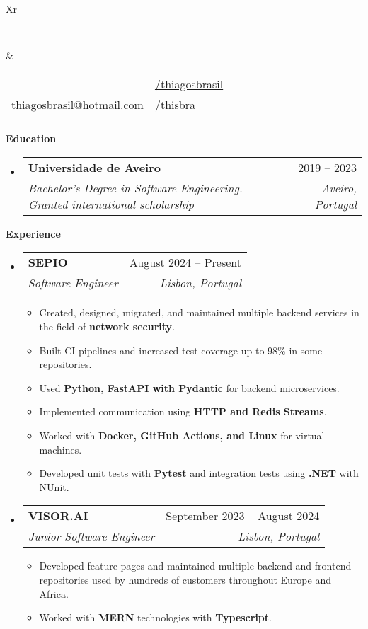 \documentclass[letterpaper,12pt]{article}[leftmargin=*]
\makeatletter
\def \fullname {Thiago S. Brasil}
\def \subtitle {}
\def \linkedinicon {\faLinkedin}
\def \linkedinlink {https://linkedin.com/in/thiagosbrasil/}
\def \linkedintext {/thiagosbrasil}
\def \phoneicon {\faPhone}
\def \phonetext {+351 933311220}
\def \emailicon {\faEnvelope}
\def \emaillink {mailto:thiagosbrasil@hotmail.com}
\def \emailtext {thiagosbrasil@hotmail.com}
\def \githubicon {\faGithub}
\def \githublink {https://github.com/thisbra}
\def \githubtext {/thisbra}
\def \headertype {\doublecol} %
\def \entryspacing {-4pt}
\def \linkedin {\linkedinicon \hspace{3pt}\href{\linkedinlink}{\linkedintext}}
\def \phone {\phoneicon \hspace{3pt}{ \phonetext}}
\def \email {\emailicon \hspace{3pt}\href{\emaillink}{\emailtext}}
\def \github {\githubicon \hspace{3pt}\href{\githublink}{\githubtext}}
\def \website {\websiteicon \hspace{3pt}\href{\websitelink}{\websitetext}}
\renewcommand{\section}[2]{\vspace{5pt}
  \colorbox{secondary}{\color{white}\raggedbottom\normalsize\textbf{{#1}{\hspace{7pt}#2}}}
}
\newcommand{\resumeEntryStart}{\begin{itemize}[leftmargin=2.5mm]}
\newcommand{\resumeEntryEnd}{\end{itemize}\vspace{\entryspacing}}
\newcommand{\resumeItemListStart}{\begin{itemize}[leftmargin=4.5mm]}
\newcommand{\resumeItemListEnd}{\end{itemize}}
\newcommand{\resumeItem}[1]{
  \item\small{
    {#1 \vspace{-2pt}}
  }
}
\newcommand{\resumeEntryTSDL}[4]{
  \vspace{-1pt}\item[]
    \begin{tabularx}{0.97\textwidth}{X@{\hspace{60pt}}r}
      \textbf{\color{primary}#1} & {\firabook\color{accent}\small#2} \\
      \textit{\color{accent}\small#3} & \textit{\color{accent}\small#4} \\
    \end{tabularx}\vspace{-6pt}
}
\newcommand{\doublecol}[6]{
  \begin{tabularx}{\textwidth}{Xr}
    {
      \begin{tabular}[c]{l}
        \fontsize{35}{45}\selectfont{\color{primary}{{\textbf{\fullname}}}} \\
        {\textit{\subtitle}} %
      \end{tabular}
    } & {
      \begin{tabular}[c]{l@{\hspace{1.5em}}l}
        {\small#4} & {\small#1} \\
        {\small#5} & {\small#2} \\
        {\small#6} & {\small#3}
      \end{tabular}
    }
  \end{tabularx}
}
\newcommand{\singlecol}[6]{
  \begin{tabularx}{\textwidth}{Xr}
    {
      \begin{tabular}[b]{l}
        \fontsize{35}{45}\selectfont{\color{primary}{{\textbf{\fullname}}}} \\
        {\textit{\subtitle}} %
      \end{tabular}
    } & {
      \begin{tabular}[c]{l}
        {\small#1} \\
        {\small#2} \\
        {\small#3} \\
        {\small#4} \\
        {\small#5} \\
        {\small#6}
      \end{tabular}
    }
  \end{tabularx}
}
\makeatother
\begin{document}


\headertype{\linkedin}{\github}{\website}{\phone}{\email}{} %
\vspace{-10pt} %

\section{\faGraduationCap}{Education}

  \resumeEntryStart
    \resumeEntryTSDL
      {Universidade de Aveiro}{2019 -- 2023}
      {Bachelor's Degree in Software Engineering. Granted international scholarship}{Aveiro, Portugal}
  \resumeEntryEnd


\section{\faPieChart}{Experience}

 \resumeEntryStart
    \resumeEntryTSDL
      {SEPIO}{August 2024 -- Present}
      {Software Engineer}{Lisbon, Portugal}
    \resumeItemListStart
      \resumeItem {Created, designed, migrated, and maintained multiple backend services in the field of \textbf{network security}.}
      \resumeItem {Built CI pipelines and increased test coverage up to 98\% in some repositories.}
      \resumeItem {Used \textbf{Python, FastAPI with Pydantic} for backend microservices.}
      \resumeItem {Implemented communication using \textbf{HTTP and Redis Streams}.}
      \resumeItem {Worked with \textbf{Docker, GitHub Actions, and Linux} for virtual machines.}
      \resumeItem {Developed unit tests with \textbf{Pytest} and integration tests using \textbf{.NET} with NUnit.}
    \resumeItemListEnd
  \resumeEntryEnd

  \resumeEntryStart
    \resumeEntryTSDL
      {VISOR.AI}{September 2023 -- August 2024}
      {Junior Software Engineer}{Lisbon, Portugal}
    \resumeItemListStart
      \resumeItem {Developed feature pages and maintained multiple backend and frontend repositories used by hundreds of customers throughout Europe and Africa.}
      \resumeItem {Worked with \textbf{MERN} technologies with \textbf{Typescript}.}
    \resumeItemListEnd
  \resumeEntryEnd
\end{document}
